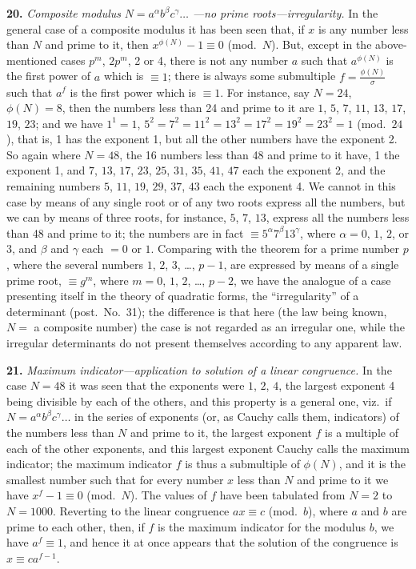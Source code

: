 \documentclass[11pt,a4paper]{book}
\begin{document}
\textbf{20.}\quad
\textit{Composite modulus} $N = a^{\alpha} b^{\beta} c^{\gamma} \ldots$ \textit{---no prime roots---irregularity.} In the general case of a composite modulus it has been seen that, if $x$ is any number less than $N$ and prime to it, then $x^{\phi(N)} - 1 \equiv 0$ (mod.\ $N$). But, except in the above-mentioned cases $p^{m}$, $2p^{m}$, 2 or 4, there is not any number $a$ such that $a^{\phi(N)}$ is the first power of $a$ which is $\equiv 1$; there is always some submultiple $f = \frac{\phi(N)}{\sigma}$ such that $a^{f}$ is the first power which is $\equiv 1$. For instance, say $N = 24$, $\phi(N) = 8$, then the numbers less than 24 and prime to it are $1$, $5$, $7$, $11$, $13$, $17$, $19$, $23$; and we have $1^{1} = 1$, $5^{2} = 7^{2} = 11^{2} = 13^{2} = 17^{2} = 19^{2} = 23^{2} = 1$ (mod.\ $24$), that is, 1 has the exponent 1, but all the other numbers have the exponent 2. So again where $N = 48$, the 16 numbers less than 48 and prime to it have, 1 the exponent 1, and $7$, $13$, $17$, $23$, $25$, $31$, $35$, $41$, $47$ each the exponent 2, and the remaining numbers $5$, $11$, $19$, $29$, $37$, $43$ each the exponent 4. We cannot in this case by means of any single root or of any two roots express all the numbers, but we can by means of three roots, for instance, $5$, $7$, $13$, express all the numbers less than 48 and prime to it; the numbers are in fact $\equiv 5^{\alpha} 7^{\beta} 13^{\gamma}$, where $\alpha = 0$, $1$, $2$, or $3$, and $\beta$ and $\gamma$ each $= 0$ or $1$. Comparing with the theorem for a prime number $p$, where the several numbers $1$, $2$, $3$, \ldots, $p - 1$, are expressed by means of a single prime root, $\equiv g^{m}$, where $m = 0$, $1$, $2$, \ldots, $p - 2$, we have the analogue of a case presenting itself in the theory of quadratic forms, the ``irregularity'' of a determinant (post.\ No.~31); the difference is that here (the law being known, $N = $ a composite number) the case is not regarded as an irregular one, while the irregular determinants do not present themselves according to any apparent law.

\textbf{21.}\quad
\textit{Maximum indicator---application to solution of a linear congruence.} In the case $N = 48$ it was seen that the exponents were $1$, $2$, $4$, the largest exponent 4 being divisible by each of the others, and this property is a general one, viz.\ if $N = a^{\alpha} b^{\beta} c^{\gamma} \ldots$ in the series of exponents (or, as Cauchy calls them, indicators) of the numbers less than $N$ and prime to it, the largest exponent $f$ is a multiple of each of the other exponents, and this largest exponent Cauchy calls the maximum indicator; the maximum indicator $f$ is thus a submultiple of $\phi(N)$, and it is the smallest number such that for every number $x$ less than $N$ and prime to it we have $x^{f} - 1 \equiv 0$ (mod.\ $N$). The values of $f$ have been tabulated from $N = 2$ to $N = 1000$. Reverting to the linear congruence $ax \equiv c$ (mod.\ $b$), where $a$ and $b$ are prime to each other, then, if $f$ is the maximum indicator for the modulus $b$, we have $a^{f} \equiv 1$, and hence it at once appears that the solution of the congruence is $x \equiv ca^{f-1}$.
\end{document}
